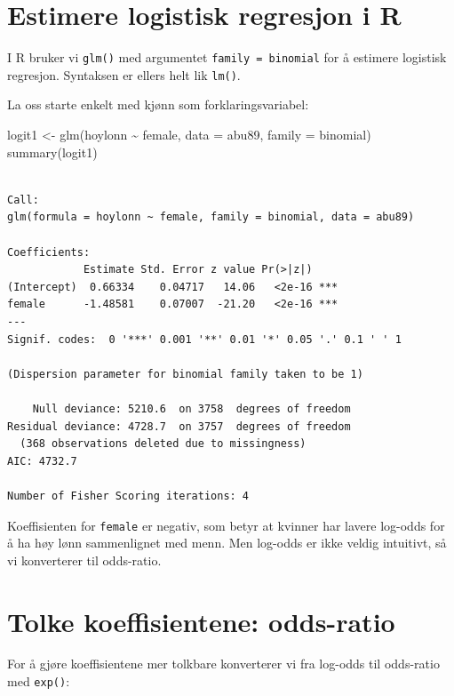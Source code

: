 \documentclass[
  norsk,
  letterpaper,
  DIV=11,
  numbers=noendperiod]{scrreprt}
\newenvironment{Shaded}{\begin{snugshade}}{\end{snugshade}}
\newcommand{\AttributeTok}[1]{\textcolor[rgb]{0.40,0.45,0.13}{#1}}
\newcommand{\FunctionTok}[1]{\textcolor[rgb]{0.28,0.35,0.67}{#1}}
\newcommand{\NormalTok}[1]{\textcolor[rgb]{0.00,0.23,0.31}{#1}}
\newcommand{\OtherTok}[1]{\textcolor[rgb]{0.00,0.23,0.31}{#1}}
\newcommand{\SpecialCharTok}[1]{\textcolor[rgb]{0.37,0.37,0.37}{#1}}
\theoremstyle{definition}
\theoremstyle{remark}
\begin{document}
\section{Estimere logistisk regresjon i
R}\label{estimere-logistisk-regresjon-i-r}

I R bruker vi \texttt{glm()} med argumentet \texttt{family\ =\ binomial}
for å estimere logistisk regresjon. Syntaksen er ellers helt lik
\texttt{lm()}.

La oss starte enkelt med kjønn som forklaringsvariabel:

\begin{Shaded}
\begin{Highlighting}[]
\NormalTok{logit1 }\OtherTok{\textless{}{-}} \FunctionTok{glm}\NormalTok{(hoylonn }\SpecialCharTok{\textasciitilde{}}\NormalTok{ female, }\AttributeTok{data =}\NormalTok{ abu89, }\AttributeTok{family =}\NormalTok{ binomial)}
\FunctionTok{summary}\NormalTok{(logit1)}
\end{Highlighting}
\end{Shaded}

\begin{verbatim}

Call:
glm(formula = hoylonn ~ female, family = binomial, data = abu89)

Coefficients:
            Estimate Std. Error z value Pr(>|z|)    
(Intercept)  0.66334    0.04717   14.06   <2e-16 ***
female      -1.48581    0.07007  -21.20   <2e-16 ***
---
Signif. codes:  0 '***' 0.001 '**' 0.01 '*' 0.05 '.' 0.1 ' ' 1

(Dispersion parameter for binomial family taken to be 1)

    Null deviance: 5210.6  on 3758  degrees of freedom
Residual deviance: 4728.7  on 3757  degrees of freedom
  (368 observations deleted due to missingness)
AIC: 4732.7

Number of Fisher Scoring iterations: 4
\end{verbatim}

Koeffisienten for \texttt{female} er negativ, som betyr at kvinner har
lavere log-odds for å ha høy lønn sammenlignet med menn. Men log-odds er
ikke veldig intuitivt, så vi konverterer til odds-ratio.

\section{Tolke koeffisientene:
odds-ratio}\label{tolke-koeffisientene-odds-ratio}

For å gjøre koeffisientene mer tolkbare konverterer vi fra log-odds til
odds-ratio med \texttt{exp()}:
\end{document}
